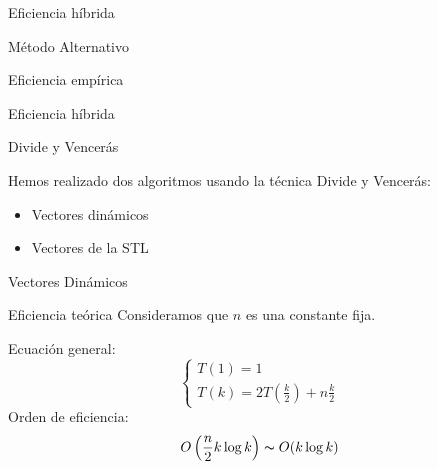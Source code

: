 \documentclass[spanish]{beamer}
\begin{document}
\begin{frame}{Eficiencia híbrida}
  \fontsize{8pt}{7.2}\selectfont
	\begin{center}
	\resizebox*{11cm}{!}{
		
	}
	\end{center}
\end{frame}

\begin{frame}{Método Alternativo}
	
\end{frame}

\begin{frame}{Eficiencia empírica}
	\begin{center}
		\resizebox*{11cm}{!}{
			}
	\end{center}
\end{frame}

\begin{frame}{Eficiencia híbrida}
  \fontsize{8pt}{7.2}\selectfont
	\begin{center}
	\resizebox*{11cm}{!}{
		
	}
	\end{center}
\end{frame}

\begin{frame}{Divide y Vencerás}

	Hemos realizado dos algoritmos usando la técnica Divide y Vencerás:
	\begin{itemize}
		\item Vectores dinámicos
		\item Vectores de la STL
	\end{itemize}
\end{frame}

\begin{frame}{Vectores Dinámicos}

	
\end{frame}

\begin{frame}{Eficiencia teórica}
    \vspace{-1em}
    Consideramos que $n$ es una constante fija.
    
    \vskip 1cm 
	Ecuación general: $$ \begin{cases} T(1) = 1\\ T(k) = 2T\left(\frac{k}{2}\right) + n\frac{k}{2} \end{cases} $$
	Orden de eficiencia: $$ O\left(\frac{n}{2}k\log k \right) \thicksim O(k\log k) $$
\end{frame}
\end{document}
